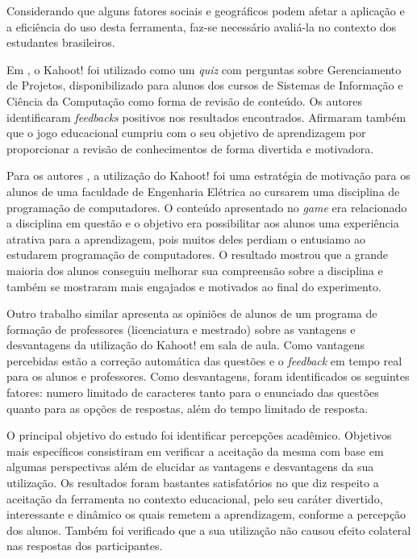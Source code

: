 \documentclass[
	12pt,				%
	openright,			%
	oneside,
	a4paper,			%
	english,			%
	french,				%
	spanish,			%
	brazil,				%
	]{abntex2}
\begin{document}

    
 Considerando que alguns fatores sociais e geográficos podem afetar a aplicação e a eficiência do uso desta ferramenta, faz-se necessário avaliá-la no contexto dos estudantes brasileiros.
 
 Em \cite{petri2016quiz}, o Kahoot! foi utilizado como um \textit{quiz} com perguntas sobre Gerenciamento de Projetos, disponibilizado para alunos dos cursos de Sistemas de
Informação e Ciência da Computação como forma de revisão de conteúdo. Os autores identificaram \textit{feedbacks} positivos nos resultados encontrados. Afirmaram também que o jogo educacional cumpriu com o seu objetivo de aprendizagem por proporcionar a revisão de conhecimentos de forma divertida e motivadora.

Para os autores \cite{abidin2017students}, a utilização do Kahoot! foi uma estratégia de motivação para os alunos de uma faculdade de Engenharia Elétrica ao cursarem uma disciplina de programação de computadores. O conteúdo apresentado no \textit{game} era relacionado a disciplina em questão e o objetivo era possibilitar aos alunos uma experiência atrativa para a aprendizagem, pois muitos deles perdiam o entusiamo ao estudarem programação de computadores. O resultado mostrou que a grande maioria dos alunos conseguiu melhorar sua  compreensão sobre a disciplina e também se mostraram mais engajados e motivados ao final do experimento.

Outro trabalho similar \cite{correia2017game} apresenta as opiniões de alunos de um programa de formação de professores (licenciatura e mestrado) sobre as vantagens e desvantagens da utilização do Kahoot! em sala de aula. Como vantagens percebidas estão a correção automática das questões e o \textit{feedback} em tempo real para os alunos e professores. Como desvantagens, foram identificados os seguintes fatores: numero limitado de caracteres tanto para o enunciado das questões quanto para as opções de respostas, além do tempo limitado de resposta.

O principal objetivo do estudo foi identificar percepções acadêmico. Objetivos mais específicos consistiram em verificar a aceitação da mesma com base em algumas perspectivas além de elucidar as vantagens e desvantagens da sua utilização. Os resultados foram bastantes satisfatórios no que diz respeito a aceitação da ferramenta no contexto educacional, pelo seu caráter divertido, interessante e dinâmico os quais remetem a aprendizagem, conforme a percepção dos alunos. Também foi verificado que a sua utilização não causou efeito colateral nas respostas dos participantes.
\end{document}
